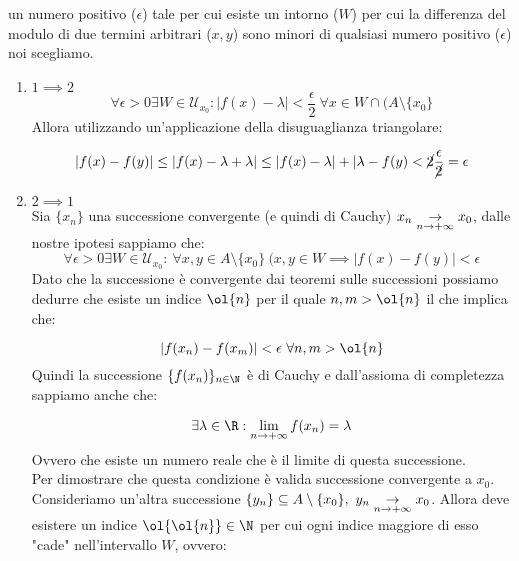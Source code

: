 \documentclass[../analisi.tex]{subfiles}
\begin{document}
un numero positivo ($\epsilon$) tale per cui esiste un intorno ($W$) per cui 
la differenza del modulo di due termini arbitrari ($x,y$) sono minori
di qualsiasi numero positivo ($\epsilon$) noi scegliamo.
\begin{dimo}

\begin{enumerate}
	\item $1 \implies 2$\\
	\begin{equation}
		\forall \epsilon > 0 \exists W \in \mathcal{U}_{x_0}:
		| f(x) - \lambda | < \frac{\epsilon}{2}\
		\forall x \in W \cap (A \setminus \{ x_0 \}
	\end{equation}
	Allora utilizzando un'applicazione della disuguaglianza triangolare:

	\begin{equation}
		| f(x) - f(y) | \leq | f(x) - \lambda + \lambda | \leq
		| f(x) - \lambda | + | \lambda - f(y) < \cancel{2} 
		\frac{\epsilon}{\cancel{2}} = \epsilon 
	\end{equation}
	
	\item $ 2 \implies 1 $\\
	Sia $ \{ x_n \} $ una successione convergente (e quindi di Cauchy)
	$ x_n \underset{n \to + \infty}{\to}
	x_0$, dalle nostre ipotesi sappiamo che:
	\begin{equation}
		\forall \epsilon > 0 \exists W \in \mathcal{U}_{x_0}:\
		\forall x,y \in A \setminus \{ x_0 \}\
		(x,y \in W \implies | f(x) - f(y)| < \epsilon
	\end{equation}
	Dato che la successione è convergente dai teoremi sulle successioni
	possiamo dedurre che esiste un indice $\ol{n}$ per il quale 
	$n,m > \ol{n}$ il che implica che:

	\begin{equation}
		| f(x_n) - f(x_m) | < \epsilon\ \forall n,m > \ol{n}
	\end{equation}
	Quindi la successione $ \{ f(x_n) \}_{n \in \N} $ è di Cauchy e 
	dall'assioma di completezza sappiamo anche che:

	\begin{equation}
		\exists \lambda \in \R :
		\lim \limits_{\nti} f(x_n) = \lambda
	\end{equation}
	Ovvero che esiste un numero reale che è il limite di questa successione.\\
	Per dimostrare che questa condizione è valida  successione
	convergente a $x_0$.\\
	Consideriamo un'altra successione $ \{ y_n \} \subseteq A \setminus 
	\{ x_0 \},\ y_n \underset{n \to + \infty}{\to} x_0 $. Allora 
	deve esistere un indice $\ol{\ol{n}} \in \N$ per cui ogni indice 
	maggiore di esso "cade" nell'intervallo $W$, ovvero:


\end{enumerate}
\end{dimo}
\end{document}
